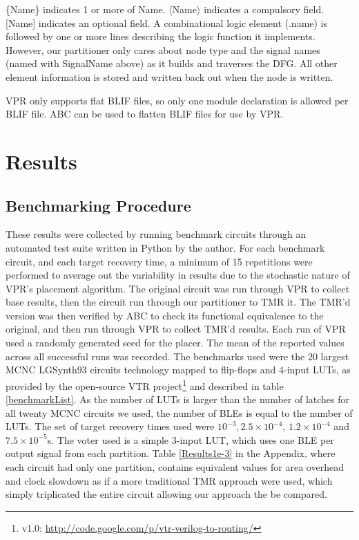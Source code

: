 \documentclass[12pt,final,oneside]{dwThesis} %
\begin{document}
   \{Name\} indicates 1 or more of Name. $\langle$Name$\rangle$ indicates a
   compulsory field. [Name] indicates an optional field.  A combinational logic
   element (.name) is followed by one or more lines describing the logic
   function it implements. However, our partitioner only cares about node type
   and the signal names (named with SignalName above) as it builds and traverses the
   \gls{DFG}. All other element information is stored and written back out when
   the node is written.

   \gls{VPR} only supports flat \gls{BLIF} files, so only one module
   declaration is allowed per \gls{BLIF} file. \gls{ABC} can be used to flatten
   \gls{BLIF} files for use by \gls{VPR}.




   \chapter{Results}\label{results}

   \section{Benchmarking Procedure}
   These results were
   collected by running benchmark circuits through an automated test suite
   written in Python by the author. For each benchmark circuit, and each target
   recovery time, a minimum of 15 repetitions were performed to average out the variability
   in results due to the stochastic nature of \gls{VPR}'s placement algorithm.
   The original circuit was run through \gls{VPR} to collect base results, then the
   circuit run through our partitioner to \gls{TMR} it. The \gls{TMR}'d version was then
   verified by \gls{ABC} to check its functional equivalence to the original,
   and then run through \gls{VPR} to collect \gls{TMR}'d results. Each run of \gls{VPR} used a
   randomly generated seed for the placer.  The mean of the reported values
   across all successful runs was recorded.  The benchmarks used were the 20
   largest \gls{MCNC} LGSynth93 circuits technology mapped to flip-flops and 4-input \glspl{LUT}, as provided by the open-source
   \gls{VTR} project\footnote{v1.0: \url{http://code.google.com/p/vtr-verilog-to-routing/}} and described in table
   \ref{benchmarkList}.
   As the number of \glspl{LUT} is larger than the number of latches for all twenty \gls{MCNC} circuits we used, the number of \glspl{BLE} is equal to the number of \glspl{LUT}.
    The set of target recovery times used were $10^{-3},
   2.5\times10^{-4}$, $1.2\times10^{-4}$ and $7.5\times10^{-5}$s.  The voter used is a simple
   3-input \gls{LUT}, which uses one \gls{BLE} per output signal from each
   partition.
   Table \ref{Results1e-3} in the Appendix, where each circuit had only one partition, contains equivalent values for area overhead and clock slowdown as if a 
   more traditional \gls{TMR} approach were used, which simply triplicated the entire circuit allowing our approach the be compared.
\end{document}
